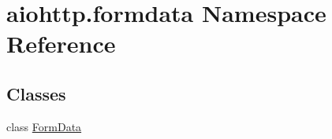 \hypertarget{namespaceaiohttp_1_1formdata}{}\section{aiohttp.\+formdata Namespace Reference}
\label{namespaceaiohttp_1_1formdata}
\subsection*{Classes}
\begin{DoxyCompactItemize}
\item 
class \hyperlink{classaiohttp_1_1formdata_1_1_form_data}{Form\+Data}
\end{DoxyCompactItemize}

